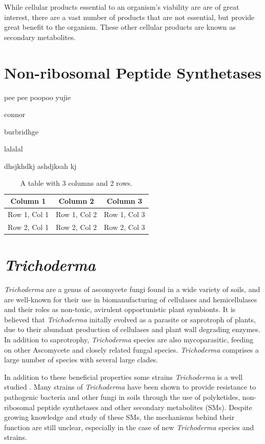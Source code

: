 While cellular products essential to an organism's viability are are
of great interest, there are a vast number of products that are not
essential, but provide great benefit to the
organism\cite{Craney2013}. These other cellular products are known as
secondary metabolites.

\section{Non-ribosomal Peptide Synthetases}
pee pee poopoo 
yujie 

connor 

burbridhge 


lalalal 

dhsjkhdkj ashdjksah kj


\begin{table}[h]
  \centering
  \begin{tabular}{|c|c|c|}
    \hline
    Column 1 & Column 2 & Column 3 \\
    \hline
    Row 1, Col 1 & Row 1, Col 2 & Row 1, Col 3 \\
    Row 2, Col 1 & Row 2, Col 2 & Row 2, Col 3 \\
    \hline
  \end{tabular}
  \caption{A table with 3 columns and 2 rows.}
  \label{tab:example-table}
\end{table}


\section{\textit{Trichoderma}}

\textit{Trichoderma} are a genus of ascomycete fungi found in a wide
variety of soils, and are well-known for their use in biomanufacturing
of cellulases and hemicellulases and their roles as non-toxic,
avirulent opportunistic plant
symbionts\cite{Woo2023}\cite{Kubicek2019}. It is believed that
\textit{Trichoderma} initally evolved as a parasite or saprotroph of
plants, due to their abundant production of cellulases and plant wall
degrading enzymes\cite{Kubicek2019}. In addition to saprotrophy,
\textit{Trichoderma} species are also mycoparasitic, feeding on other
Ascomycete and closely related fungal
species\cite{Druzhinina2018}. \textit{Trichoderma} comprises a large
number of species with several large clades.

In addition to these beneficial properties some strains  \textit{Trichoderma} is a
well studied . Many strains of \textit{Trichoderma} have been shown to
provide resistance to pathogenic bacteria and other fungi in soils
through the use of polyketides, non-ribosomal peptide synthetases and
other secondary metabolites\cite{Woo2023} (SMs). Despite growing
knowledge and study of these SMs, the mechanisms behind their function
are still unclear\cite{Baker2012}, especially in the case of new
\textit{Trichoderma} species and strains.

